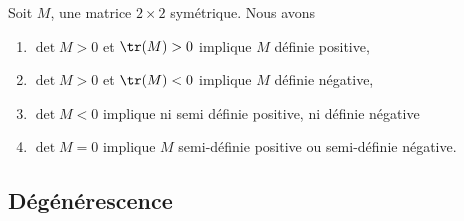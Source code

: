 \begin{proposition}     \label{PropcnJyXZ}
    Soit $M$, une matrice $2\times 2$ symétrique. Nous avons
    \begin{enumerate}
        \item
        $\det M>0$ et $\tr(M)>0$ implique $M$ définie positive,
        \item
        $\det M>0$ et $\tr(M)<0$ implique $M$ définie négative,
    \item   \label{ItemluuFPN}
        $\det M<0$ implique ni semi définie positive, ni définie négative 
        \item
        $\det M=0$ implique $M$ semi-définie positive ou semi-définie négative.
    \end{enumerate}
\end{proposition}

\subsection{Dégénérescence}

